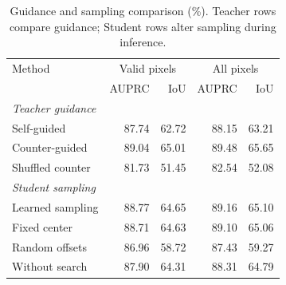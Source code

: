\begin{table}[!t]
\caption{Guidance and sampling comparison (\%). Teacher rows compare guidance; Student rows alter sampling during inference.}
\label{tab:search_intervention}
\centering\scriptsize
\setlength{\tabcolsep}{2.5pt}
\begin{tabular}{lrrrr}
\toprule
Method & \multicolumn{2}{c}{Valid pixels} & \multicolumn{2}{c}{All pixels}\\
 & AUPRC & IoU & AUPRC & IoU\\
\midrule
\multicolumn{5}{l}{\emph{Teacher guidance}}\\
Self-guided & 87.74 & 62.72 & 88.15 & 63.21\\
Counter-guided & 89.04 & 65.01 & 89.48 & 65.65\\
Shuffled counter & 81.73 & 51.45 & 82.54 & 52.08\\
\midrule
\multicolumn{5}{l}{\emph{Student sampling}}\\
Learned sampling & 88.77 & 64.65 & 89.16 & 65.10\\
Fixed center & 88.71 & 64.63 & 89.10 & 65.06\\
Random offsets & 86.96 & 58.72 & 87.43 & 59.27\\
Without search & 87.90 & 64.31 & 88.31 & 64.79\\
\bottomrule
\end{tabular}
\end{table}
